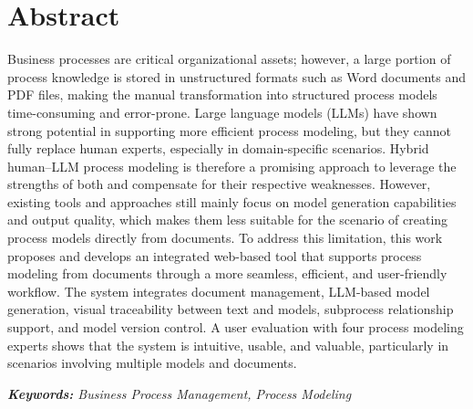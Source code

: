 \chapter*{Abstract}
\noindent
Business processes are critical organizational assets; however, a large portion of process knowledge is stored in unstructured formats such as Word documents and PDF files, making the manual transformation into structured process models time-consuming and error-prone. Large language models (LLMs) have shown strong potential in supporting more efficient process modeling, but they cannot fully replace human experts, especially in domain-specific scenarios. Hybrid human–LLM process modeling is therefore a promising approach to leverage the strengths of both and compensate for their respective weaknesses. However, existing tools and approaches still mainly focus on model generation capabilities and output quality, which makes them less suitable for the scenario of creating process models directly from documents. To address this limitation, this work proposes and develops an integrated web-based tool that supports process modeling from documents through a more seamless, efficient, and user-friendly workflow. The system integrates document management, LLM-based model generation, visual traceability between text and models, subprocess relationship support, and model version control. A user evaluation with four process modeling experts shows that the system is intuitive, usable, and valuable, particularly in scenarios involving multiple models and documents.

\textit{\textbf{Keywords: } Business Process Management, Process Modeling}